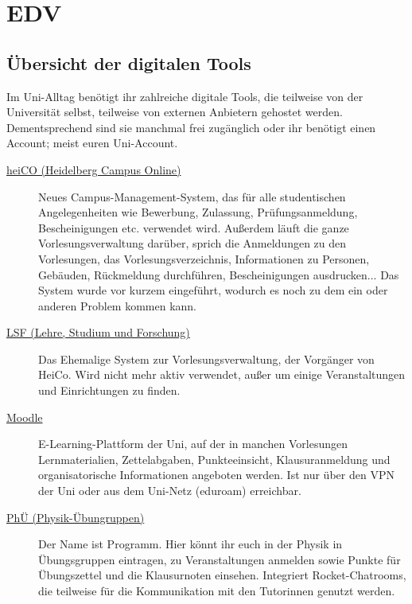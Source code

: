 \section{EDV}

\subsection{Übersicht der digitalen Tools}
\label{digitale-tools-uebersicht}

Im Uni-Alltag benötigt ihr zahlreiche digitale Tools, die teilweise von der Universität selbst, teilweise von externen Anbietern gehostet werden. Dementsprechend sind sie manchmal frei zugänglich oder ihr benötigt einen Account; meist euren Uni-Account.

\begin{description}
    \item[\href{https://heico.uni-heidelberg.de/}{heiCO (Heidelberg Campus Online)}]
    Neues Campus-Management-System, das für alle studentischen Angelegenheiten wie Bewerbung, Zulassung, Prüfungsanmeldung, Bescheinigungen etc. verwendet wird. Außerdem läuft die ganze Vorlesungsverwaltung darüber, sprich die Anmeldungen zu den Vorlesungen, das Vorlesungsverzeichnis, Informationen zu Personen, Gebäuden, Rückmeldung durchführen, Bescheinigungen ausdrucken... Das System wurde vor kurzem eingeführt, wodurch es noch zu dem ein oder anderen Problem kommen kann.

	\item[\href{https://lsf.uni-heidelberg.de/}{LSF (Lehre, Studium und Forschung)}]
    Das Ehemalige System zur Vorlesungsverwaltung, der Vorgänger von HeiCo. Wird nicht mehr aktiv verwendet, außer um einige Veranstaltungen und Einrichtungen zu finden.

	\item[\href{https://moodle.uni-heidelberg.de}{Moodle}]
    E-Learning-Plattform der Uni, auf der in manchen Vorlesungen Lernmaterialien, Zettelabgaben, Punkteeinsicht, Klausuranmeldung und organisatorische Informationen angeboten werden. Ist nur über den VPN der Uni oder aus dem Uni-Netz (eduroam) erreichbar.

	\item[\href{https://uebungen.physik.uni-heidelberg.de}{PhÜ (Physik-Übungruppen)}]
    Der Name ist Programm. Hier könnt ihr euch in der Physik in Übungsgruppen eintragen, zu Veranstaltungen anmelden sowie Punkte für Übungszettel und die Klausurnoten einsehen. Integriert Rocket-Chatrooms, die teilweise für die Kommunikation mit den Tutorinnen genutzt werden.


\end{description}
